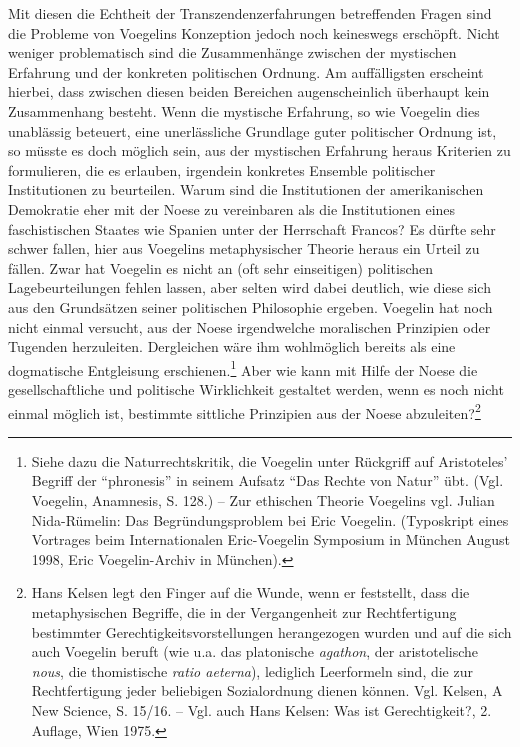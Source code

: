 Mit diesen die Echtheit der Transzendenzerfahrungen betreffenden Fragen sind
die Probleme von Voegelins Konzeption jedoch noch keineswegs erschöpft. Nicht
weniger problematisch sind die Zusammenhänge zwischen der mystischen Erfahrung
und der konkreten politischen Ordnung. Am auf\/fälligsten erscheint hierbei,
dass zwischen diesen beiden Bereichen augenscheinlich überhaupt kein
Zusammenhang besteht. Wenn die mystische Erfahrung, so wie Voegelin dies
unablässig beteuert, eine unerlässliche Grundlage guter politischer Ordnung
ist, so müsste es doch möglich sein, aus der mystischen Erfahrung heraus
Kriterien zu formulieren, die es erlauben, irgendein konkretes Ensemble
politischer Institutionen zu beurteilen. Warum sind die Institutionen der
amerikanischen Demokratie eher mit der Noese zu vereinbaren als die
Institutionen eines faschistischen Staates wie Spanien unter der Herrschaft
Francos? Es dürfte sehr schwer fallen, hier aus Voegelins metaphysischer
Theorie heraus ein Urteil zu fällen. Zwar hat Voegelin es nicht an (oft sehr
einseitigen) politischen Lagebeurteilungen fehlen lassen, aber selten wird
dabei deutlich, wie diese sich aus den Grundsätzen seiner politischen
Philosophie ergeben.  Voegelin hat noch nicht einmal versucht, aus der Noese
irgendwelche moralischen Prinzipien oder Tugenden herzuleiten. Dergleichen
wäre ihm wohlmöglich bereits als eine dogmatische Entgleisung
erschienen.\footnote{Siehe dazu die Naturrechtskritik, die Voegelin unter
  Rückgriff auf Aristoteles' Begriff der "`phronesis"' in seinem Aufsatz "`Das
  Rechte von Natur"' übt. (Vgl.  Voegelin, Anamnesis, S. 128.) -- Zur
  ethischen Theorie Voegelins vgl. Julian Nida-Rümelin: Das Begründungsproblem
  bei Eric Voegelin. (Typoskript eines Vortrages beim Internationalen
  Eric-Voegelin Symposium in München August 1998, Eric Voegelin-Archiv in
  München).} Aber wie kann mit Hilfe der Noese die gesellschaftliche und
politische Wirklichkeit gestaltet werden, wenn es noch nicht einmal möglich
ist, bestimmte sittliche Prinzipien aus der Noese abzuleiten?\footnote{Hans
  Kelsen legt den Finger auf die Wunde, wenn er feststellt, dass die
  metaphysischen Begriffe, die in der Vergangenheit zur Rechtfertigung
  bestimmter Gerechtigkeitsvorstellungen herangezogen wurden und auf die sich
  auch Voegelin beruft (wie u.a. das platonische {\em agathon}, der
  aristotelische {\em nous}, die thomistische {\em ratio aeterna}), lediglich
  Leerformeln sind, die zur Rechtfertigung jeder beliebigen Sozialordnung
  dienen können.  Vgl.  Kelsen, A New Science, S.  15/16. -- Vgl. auch Hans
  Kelsen: Was ist Gerechtigkeit?, 2. Auflage, Wien 1975.}

